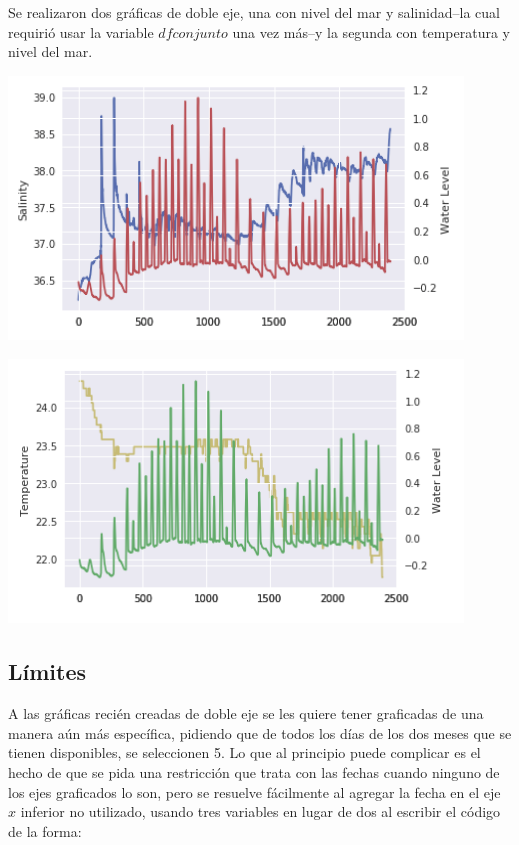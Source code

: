 \documentclass{article}
\begin{document}
Se realizaron dos gráficas de doble eje, una con nivel del mar y salinidad--la cual requirió usar la variable $dfconjunto$ una vez más--y la segunda con temperatura y nivel del mar.

	\begin{center}
    \includegraphics[height=7cm]{dobd3.png}
    \end{center}

	\begin{center}
	\includegraphics[height=7cm]{dobd2.png}
	\end{center}
    
\subsection{Límites}
A las gráficas recién creadas de doble eje se les quiere tener graficadas de una manera aún más específica, pidiendo que de todos los días de los dos meses que se tienen disponibles, se seleccionen 5. Lo que al principio puede complicar es el hecho de que se pida una restricción que trata con las fechas cuando ninguno de los ejes graficados lo son, pero se resuelve fácilmente al agregar la fecha en el eje $x$ inferior no utilizado, usando tres variables en lugar de dos al escribir el código de la forma:
\end{document}
